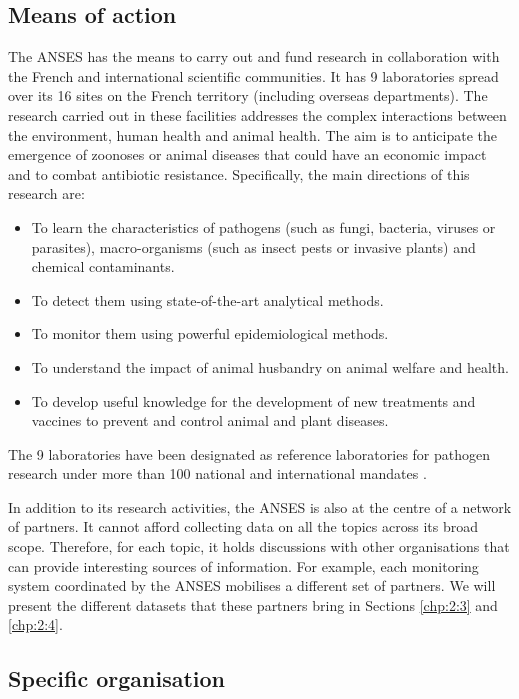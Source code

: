 \subsection{Means of action}

The ANSES has the means to carry out and fund research in collaboration with the French and international scientific communities. It has 9 laboratories spread over its 16 sites on the French territory (including overseas departments). The research carried out in these facilities addresses the complex interactions between the environment, human health and animal health. The aim is to anticipate the emergence of zoonoses or animal diseases that could have an economic impact and to combat antibiotic resistance. Specifically, the main directions of this research are:
\begin{itemize}
\item To learn the characteristics of pathogens (such as fungi, bacteria, viruses or parasites), macro-organisms (such as insect pests or invasive plants) and chemical contaminants.
\item To detect them using state-of-the-art analytical methods.
\item To monitor them using powerful epidemiological methods.
\item To understand the impact of animal husbandry on animal welfare and health.
\item To develop useful knowledge for the development of new treatments and vaccines to prevent and control animal and plant diseases. 
\end{itemize} 
The 9 laboratories have been designated as reference laboratories for pathogen research under more than 100 national and international mandates \citep{ANSESLABS}.

In addition to its research activities, the ANSES is also at the centre of a network of partners. It cannot afford collecting data on all the topics across its broad scope. Therefore, for each topic, it holds discussions with other organisations that can provide interesting sources of information. For example, each monitoring system coordinated by the ANSES mobilises a different set of partners. We will present the different datasets that these partners bring in Sections \ref{chp:2:3} and \ref{chp:2:4}.

\subsection{Specific organisation}

